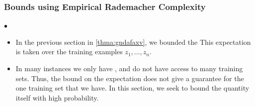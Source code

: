 \documentclass{article}
\begin{document}
\subsubsection{Bounds using Empirical Rademacher Complexity}
$\bullet$ 

\begin{itemize}
    \item In the previous section in \cref{thma:gndafaxv}, we bounded the  This expectation is taken over the training examples $z_{1}, \ldots, z_{n}$.
    \item In many instances we only have , and do not have access to many training sets. Thus, the bound on the expectation does not give a guarantee for the one training set that we have. In this section, we seek to bound the quantity itself with high probability.
\end{itemize} 
\end{document}
